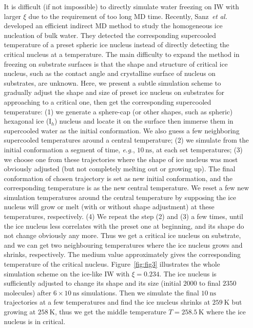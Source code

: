\documentclass[aps,prl,twocolumn,superscriptaddress]{revtex4-1}
\begin{document}
It is difficult (if not impossible) to directly simulate water freezing on IW with larger $\xi$ due to the requirement of too long MD time. 
Recently, Sanz~\emph{et al.}~\cite{Sanz2013} developed an efficient indirect MD method to study the homogeneous ice nucleation of bulk water. They detected the corresponding supercooled temperature of a preset spheric ice nucleus instead of directly detecting the critical nucleus at a temperature. 
The main difficulty to expand the method in freezing on substrate surfaces is that the shape and structure of critical ice nucleus, such as the contact angle and crystalline surface of nucleus on substrates, are unknown. 
Here, we present a subtle simulation scheme to gradually adjust the shape and size of preset ice nucleus on substrates for approaching to a critical one, then get the corresponding supercooled temperature:    
(1) we generate a sphere-cap (or other shapes, such as spheric) hexagonal ice (I$_{h}$) nucleus and locate it on the surface then immerse them in supercooled water as the initial conformation. We also guess a few neighboring supercooled temperatures around a central temperature; (2) we simulate from the initial conformation a segment of time, \emph{e.g.}, $10~ \mathrm{ns}$, at each set temperatures; (3) we choose one from these trajectories where the shape of ice nucleus was most obviously adjusted (but not completely melting out or growing up). The final conformation of chosen trajectory is set as new initial conformation, and the corresponding temperature is as the new central temperature. We reset a few new simulation temperatures around the central temperature by supposing the ice nucleus will grow or melt (with or without shape adjustment) at these temperatures, respectively. 
(4) We repeat the step (2) and (3) a few times, until the ice nucleus less correlates with the preset one at beginning, and its shape do not change obviously any more. Thus we get a critical ice nucleus on substrate, and we can get two neighbouring temperatures where the ice nucleus grows and shrinks, respectively. The medium value approximately gives the corresponding temperature of the critical nucleus. Figure~\ref{fig:fig3} illustrates the whole simulation scheme on the ice-like IW with $\xi=0.234$. The ice nucleus is sufficiently adjusted to change its shape and its size (initial $2000$ to final $2350$ molecules) after $6 \times 10~\mathrm{ns}$ simulations. Then we simulate the final $10~\mathrm{ns}$ trajectories at a few temperatures and find the ice nucleus shrinks at $259~\mathrm{K}$ but growing at $258~\mathrm{K}$, thus we get the middle temperature $T=258.5~\mathrm{K}$ where the ice nucleus is in critical. 
 
\end{document}

